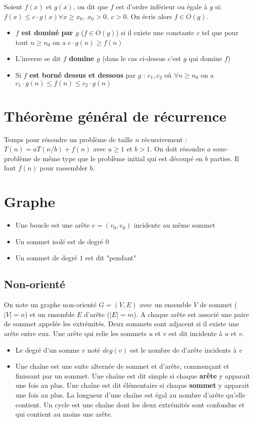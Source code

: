 \documentclass[11pt,a4paper]{report}
\begin{document}
Soient $f(x)$ et $g(x)$, on dit que $f$ est d'ordre inférieur ou égale à $g$ si: $f(x) \leq c\cdot g(x) \forall x \geq x_0,\ x_0>0,\ c > 0$. On écris alors $f\in O(g)$.
\begin{itemize}
    \item \textbf{$f$ est dominé par $g$} ($f\in O(g)$) si il existe une constante $c$ tel que pour tout $n\geq n_0$ on a $c\cdot g(n) \geq f(n)$
    \item L'inverse se dit \textbf{$f$ domine $g$} (dans le cas ci-dessus c'est $g$ qui domine $f$)
    \item Si \textbf{$f$ est borné dessus \textbf{et} dessous} par $g$ : $c_1,c_2$ où $\forall n \geq n_0$ on a $c_1\cdot g(n) \leq f(n) \leq c_2 \cdot g(n)$
\end{itemize}

\section{Théorème général de récurrence}
Temps pour résoudre un problème de taille $n$ récursivement : $T(n) = aT(n/b) + f(n)$ avec $a\geq 1$ et $b > 1$. On doit résoudre $a$ sous-problème de même type que le problème initial qui est découpé en $b$ parties. Il faut $f(n)$ pour rassembler $b$.

\section{Graphe}

\begin{itemize}
    \item Une boucle est une arête $e=(v_0,v_0)$ incidente au même sommet
    \item Un sommet isolé est de degré $0$
    \item Un sommet de degré $1$ est dit "pendant"
\end{itemize}

\subsection{Non-orienté}
On note un graphe non-orienté $G=(V,E)$ avec un ensemble $V$ de sommet ($|V|=n$) et un ensemble $E$ d'arête ($|E|=m$). A chaque arête est associé une paire de sommet appelée les extrémités. Deux sommets sont adjacent si il existe une arête entre eux. Une arête qui relie les sommets $u$ et $v$ est dit incidente à $u$ et $v$.

\begin{itemize}
    \item Le degré d'un somme $v$ noté $deg(v)$ est le nombre de d'arête incidents à $v$
    \item Une chaîne est une suite alternée de sommet et d'arête, commençant et finissant par un sommet. Une chaîne est dit simple si chaque \textbf{arête} y apparait une fois au plus. Une chaîne est dit élémentaire si chaque \textbf{sommet} y apparait une fois au plus. La longueur d'une chaîne est égal au nombre d'arête qu'elle contient. Un cycle est une chaîne dont les deux extrémités sont confondus et qui contient au moins une arête.
\end{itemize}
\end{document}
